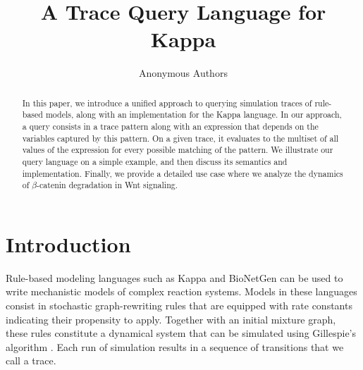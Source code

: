 \documentclass[runningheads]{llncs}
\begin{document}
\title{A Trace Query Language for Kappa}

\author{Anonymous Authors}




\maketitle


\begin{abstract}
  In this paper, we introduce a unified approach to querying
  simulation traces of rule-based models, along with an implementation
  for the Kappa language. In our approach, a query consists in a trace
  pattern along with an expression that depends on the variables
  captured by this pattern. On a given trace, it evaluates to the
  multiset of all values of the expression for every possible matching
  of the pattern. We illustrate our query language on a simple
  example, and then discuss its semantics and implementation. Finally,
  we provide a detailed use case where we analyze the dynamics of
  $\beta$-catenin degradation in Wnt signaling.

\end{abstract}


\section{Introduction}

Rule-based modeling languages such as Kappa \cite{DanosEtAl-CONCUR07}
and BioNetGen \cite{bngl} can be used to write mechanistic models of
complex reaction systems. Models in these languages consist in
stochastic graph-rewriting rules that are equipped with rate constants
indicating their propensity to apply. Together with an initial mixture
graph, these rules constitute a dynamical system that can be simulated
using Gillespie's algorithm
\cite{gillespie1977exact,DanosEtAl-APLAS07,BoutillierEK17}. Each run
of simulation results in a sequence of transitions that we call a
trace.
\end{document}
